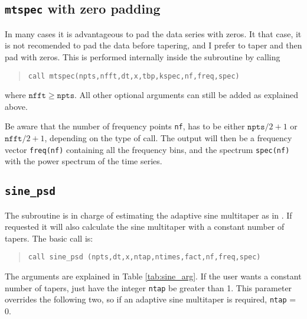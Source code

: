 \documentclass{article}
\begin{document}
\subsection{\texttt{mtspec} with zero padding}
In many cases it is advantageous to pad the data series with zeros. It that case, it is not recomended to pad the data before tapering, and I prefer to taper and then pad with zeros. This is performed internally inside the subroutine by calling
\begin{quote}
\begin{verbatim}
call mtspec(npts,nfft,dt,x,tbp,kspec,nf,freq,spec)
\end{verbatim}
\end{quote}
where $\mathtt{nfft} \ge \mathtt{npts}$. All other optional arguments can still be added as explained above.

Be aware that the number of frequency points \texttt{nf}, has to be either $\mathtt{npts}/2 + 1$ or $\mathtt{nfft}/2+1$, depending on the type of call. The output will then be a frequency vector \texttt{freq(nf)} containing all the frequency bins, and the spectrum \texttt{spec(nf)} with the power spectrum of the time series. 

\subsection{\texttt{sine\_psd}}
The subroutine is in charge of estimating the adaptive sine multitaper as in \citet{riedel_sidorenko_95}. If requested it will also calculate the sine multitaper with a constant number of tapers. The basic call is:
\begin{quote}
\begin{verbatim}
call sine_psd (npts,dt,x,ntap,ntimes,fact,nf,freq,spec)
\end{verbatim}
\end{quote}
The arguments are explained in Table \ref{tab:sine_arg}. If the user wants a constant number of tapers, just have the integer \texttt{ntap} be greater than 1. This parameter overrides the following two, so if an adaptive sine multitaper is required, \texttt{ntap} = 0.
\end{document}
